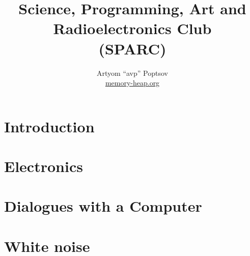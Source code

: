 \documentclass[a4paper,twoside]{book}
\title{Science, Programming, Art and Radioelectronics Club\\(SPARC)}
\author{Artyom ``avp'' Poptsov\\\href{https://memory-heap.org}{memory-heap.org}}
\begin{document}
\maketitle

\tableofcontents

\chapter*{Introduction}




\chapter{Electronics}
\label{chapter:electronics}








\chapter{Dialogues with a Computer}
\label{chapter:dialogues-with-computer}







\newpage







\chapter{White noise}
\label{chapter:white-noise}
\end{document}

